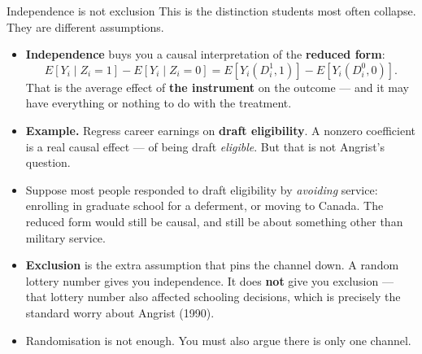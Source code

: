 \documentclass[
  11pt,
  ignorenonframetext,
  aspectratio=169,
]{beamer}
\providecommand{\tightlist}{%
  \setlength{\itemsep}{0pt}\setlength{\parskip}{0pt}}
\begin{document}
\begin{frame}{Independence is not exclusion}
\protect{}\label{independence-is-not-exclusion}
This is the distinction students most often collapse. They are different
assumptions.

\begin{itemize}
\tightlist
\item
  \textbf{Independence} buys you a causal interpretation of the
  \textbf{reduced form}: \[
  E[Y_i \mid Z_i = 1] - E[Y_i \mid Z_i = 0] = E[Y_i(D^1_i, 1)] - E[Y_i(D^0_i, 0)].
  \] That is the average effect of \textbf{the instrument} on the
  outcome --- and it may have everything or nothing to do with the
  treatment.
\item
  \textbf{Example.} Regress career earnings on \textbf{draft
  eligibility}. A nonzero coefficient is a real causal effect --- of
  being draft \emph{eligible}. But that is not Angrist's question.
\item
  Suppose most people responded to draft eligibility by \emph{avoiding}
  service: enrolling in graduate school for a deferment, or moving to
  Canada. The reduced form would still be causal, and still be about
  something other than military service.
\item
  \textbf{Exclusion} is the extra assumption that pins the channel down.
  A random lottery number gives you independence. It does \textbf{not}
  give you exclusion --- that lottery number also affected schooling
  decisions, which is precisely the standard worry about Angrist (1990).
\item
  Randomisation is not enough. You must also argue there is only one
  channel.
\end{itemize}
\end{frame}
\end{document}

